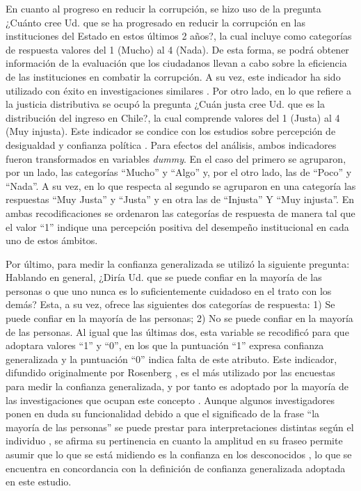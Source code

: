 \documentclass[12pt,twoside]{templates/facsothesis}
\begin{document}
En cuanto al progreso en reducir la corrupción, se hizo uso de la pregunta ¿Cuánto cree Ud. que se ha progresado en reducir la corrupción en las instituciones del Estado en estos últimos 2 años?, la cual incluye como categorías de respuesta valores del 1 (Mucho) al 4 (Nada). De esta forma, se podrá obtener información de la evaluación que los ciudadanos llevan a cabo sobre la eficiencia de las instituciones en combatir la corrupción. A su vez, este indicador ha sido utilizado con éxito en investigaciones similares \citep{andrianiInstitutionalTrustCorruption2021}. Por otro lado, en lo que refiere a la justicia distributiva se ocupó la pregunta ¿Cuán justa cree Ud. que es la distribución del ingreso en Chile?, la cual comprende valores del 1 (Justa) al 4 (Muy injusta). Este indicador se condice con los estudios sobre percepción de desigualdad y confianza política \citep{leeEconomicPerformanceIncome2020, wuIncomeInequalityDistributive2019, zmerliIncomeInequalityDistributive2015}. Para efectos del análisis, ambos indicadores fueron transformados en variables \emph{dummy}. En el caso del primero se agruparon, por un lado, las categorías ``Mucho'' y ``Algo'' y, por el otro lado, las de ``Poco'' y ``Nada''. A su vez, en lo que respecta al segundo se agruparon en una categoría las respuestas ``Muy Justa'' y ``Justa'' y en otra las de ``Injusta'' Y ``Muy injusta''. En ambas recodificaciones se ordenaron las categorías de respuesta de manera tal que el valor ``1'' indique una percepción positiva del desempeño institucional en cada uno de estos ámbitos.

Por último, para medir la confianza generalizada se utilizó la siguiente pregunta: Hablando en general, ¿Diría Ud. que se puede confiar en la mayoría de las personas o que uno nunca es lo suficientemente cuidadoso en el trato con los demás? Esta, a su vez, ofrece las siguientes dos categorías de respuesta: 1) Se puede confiar en la mayoría de las personas; 2) No se puede confiar en la mayoría de las personas. Al igual que las últimas dos, esta variable se recodificó para que adoptara valores ``1'' y ``0'', en los que la puntuación ``1'' expresa confianza generalizada y la puntuación ``0'' indica falta de este atributo. Este indicador, difundido originalmente por Rosenberg \citeyearpar{rosenbergMisanthropyPoliticalIdeology1956}, es el más utilizado por las encuestas para medir la confianza generalizada, y por tanto es adoptado por la mayoría de las investigaciones que ocupan este concepto \citep{andrianiInstitutionalTrustCorruption2021, garcia-sanchezEconomicInequalityUnfairness2025a, mattesSocialPoliticalTrust2018, newtonThreeFormsTrust2011, oskarssonGeneralizedTrustPolitical2010}. Aunque algunos investigadores ponen en duda su funcionalidad debido a que el significado de la frase ``la mayoría de las personas'' se puede prestar para interpretaciones distintas según el individuo \citep{justwanMeasuringSocialTrust2018}, se afirma su pertinencia en cuanto la amplitud en su fraseo permite asumir que lo que se está midiendo es la confianza en los desconocidos \citep{oskarssonGeneralizedTrustPolitical2010, uslanerMoralFoundationsTrust2002}, lo que se encuentra en concordancia con la definición de confianza generalizada adoptada en este estudio.
\end{document}
